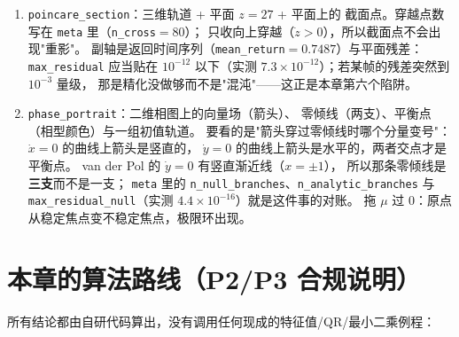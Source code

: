 \begin{enumerate}
        按 $n_{\text{block}}$ 块给标准误（默认实测最大标准误 $6.9\times10^{-3}$）。
        要看的是 $\lambda>0$ 的区间与分岔图上"点云糊掉"的区间**重合**，
        以及周期窗口里 $\lambda$ 掉回负值（窗口里的运动是周期的，不分离）。
  \item \texttt{poincare\_}\allowbreak\texttt{section}：三维轨道 + 平面 $z=27$ + 平面上的
        截面点。穿越点数写在 \texttt{meta} 里（\texttt{n\_cross}$=80$）；
        只收向上穿越（$\dot z>0$），所以截面点不会出现"重影"。
        副轴是返回时间序列（\texttt{mean\_return}$=0.7487$）与平面残差：
        \texttt{max\_residual} 应当贴在 $10^{-12}$ 以下（实测 $7.3\times10^{-12}$）；若某帧的残差突然到 $10^{-3}$ 量级，
        那是精化没做够而不是"混沌"——这正是本章第六个陷阱。
  \item \texttt{phase\_}\allowbreak\texttt{portrait}：二维相图上的向量场（箭头）、
        零倾线（两支）、平衡点（相型颜色）与一组初值轨道。
        要看的是"箭头穿过零倾线时哪个分量变号"：$\dot x=0$ 的曲线上箭头是竖直的，
        $\dot y=0$ 的曲线上箭头是水平的，两者交点才是平衡点。
        van der Pol 的 $\dot y=0$ 有竖直渐近线（$x=\pm1$），
        所以那条零倾线是\textbf{三支}而不是一支；
        \texttt{meta} 里的 \texttt{n\_null\_branches}、\texttt{n\_analytic\_branches}
        与 \texttt{max\_residual\_null}（实测 $4.4\times10^{-16}$）就是这件事的对账。
        拖 $\mu$ 过 $0$：原点从稳定焦点变不稳定焦点，极限环出现。
\end{enumerate}

\section{本章的算法路线（P2/P3 合规说明）}

所有结论都由自研代码算出，没有调用任何现成的特征值/QR/最小二乘例程：

